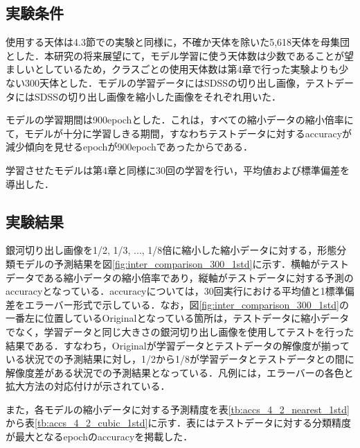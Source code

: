 \documentclass[a4j, 11pt]{jreport}
\begin{document}
\subsection{実験条件}
使用する天体は4.3節での実験と同様に，不確か天体を除いた5,618天体を母集団とした．本研究の将来展望にて，モデル学習に使う天体数は少数であることが望ましいとしているため，クラスごとの使用天体数は第4章で行った実験よりも少ない300天体とした．モデルの学習データにはSDSSの切り出し画像，テストデータにはSDSSの切り出し画像を縮小した画像をそれぞれ用いた．

モデルの学習期間は900epochとした．これは，すべての縮小データの縮小倍率にて，モデルが十分に学習しきる期間，すなわちテストデータに対するaccuracyが減少傾向を見せるepochが900epochであったからである．

学習させたモデルは第4章と同様に30回の学習を行い，平均値および標準偏差を導出した．


\subsection{実験結果}
銀河切り出し画像を1/2, 1/3, ..., 1/8倍に縮小した縮小データに対する，形態分類モデルの予測結果を図\ref{fig:inter_comparison_300_1std}に示す．横軸がテストデータである縮小データの縮小倍率であり，縦軸がテストデータに対する予測のaccuracyとなっている．accuracyについては，30回実行における平均値と1標準偏差をエラーバー形式で示している．なお，図\ref{fig:inter_comparison_300_1std}の一番左に位置しているOriginalとなっている箇所は，テストデータに縮小データでなく，学習データと同じ大きさの銀河切り出し画像を使用してテストを行った結果である．すなわち，Originalが学習データとテストデータの解像度が揃っている状況での予測結果に対し，1/2から1/8が学習データとテストデータとの間に解像度差がある状況での予測結果となっている．凡例には，エラーバーの各色と拡大方法の対応付けが示されている．

また，各モデルの縮小データに対する予測精度を表\ref{tb:accs_4_2_nearest_1std}から表\ref{tb:accs_4_2_cubic_1std}に示す．表にはテストデータに対する分類精度が最大となるepochのaccuracyを掲載した．


\end{document}
